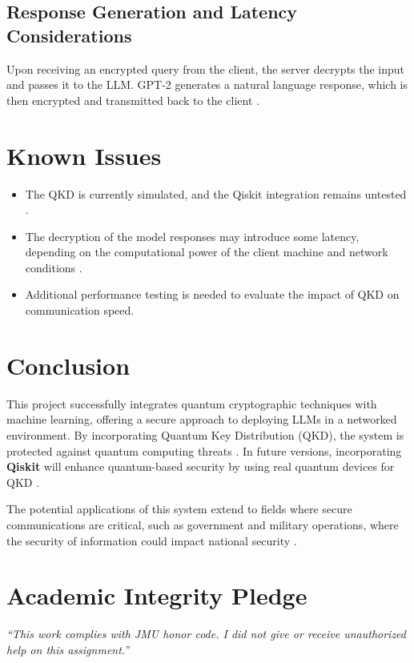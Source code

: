 \documentclass{article}
\begin{document}
\subsection{Response Generation and Latency Considerations}
Upon receiving an encrypted query from the client, the server decrypts the input and passes it to the LLM. GPT-2 generates a natural language response, which is then encrypted and transmitted back to the client \cite{huggingface_gpt2_2024}. 

\section{Known Issues}
\begin{itemize}
    \item The QKD is currently simulated, and the Qiskit integration remains untested \cite{nsa2024}.
    \item The decryption of the model responses may introduce some latency, depending on the computational power of the client machine and network conditions \cite{huggingface_gpt2_2024}.
    \item Additional performance testing is needed to evaluate the impact of QKD on communication speed.
\end{itemize}

\section{Conclusion}
This project successfully integrates quantum cryptographic techniques with machine learning, offering a secure approach to deploying LLMs in a networked environment. By incorporating Quantum Key Distribution (QKD), the system is protected against quantum computing threats \cite{nsa2024}. In future versions, incorporating \textbf{Qiskit} will enhance quantum-based security by using real quantum devices for QKD \cite{nielsen2010}.

The potential applications of this system extend to fields where secure communications are critical, such as government and military operations, where the security of information could impact national security \cite{nsa2024}.

\newpage
\printbibliography %

\vfill
\section*{Academic Integrity Pledge}
{\color{red}\textit{“This work complies with JMU honor code. I did not give or receive unauthorized help on this assignment.”}}
\end{document}
